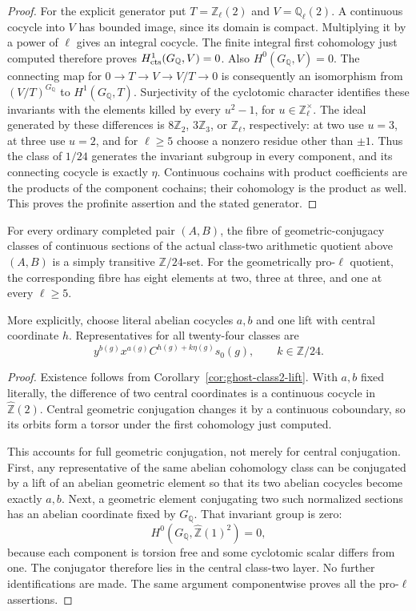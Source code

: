 \begin{proof}
For the explicit generator put \(T=\mathbb Z_\ell(2)\)
and \(V=\mathbb Q_\ell(2)\). A continuous cocycle into
\(V\) has bounded image, since its domain is compact.
Multiplying it by a power of \(\ell\) gives an integral
cocycle. The finite integral first cohomology just
computed therefore proves \(H^1_{\rm cts}(G_{\mathbb Q},V)=0\).
Also \(H^0(G_{\mathbb Q},V)=0\). The connecting map
for \(0\to T\to V\to V/T\to0\) is consequently an
isomorphism from \((V/T)^{G_{\mathbb Q}}\) to \(H^1(G_{\mathbb Q},T)\).
Surjectivity of the cyclotomic character identifies
these invariants with the elements killed by every
\(u^2-1\), for \(u\in\mathbb Z_\ell^\times\).
The ideal generated by these differences is
\(8\mathbb Z_2\), \(3\mathbb Z_3\), or \(\mathbb Z_\ell\),
respectively: at two use \(u=3\), at three use \(u=2\),
and for \(\ell\ge5\) choose a nonzero residue other
than \(\pm1\). Thus the class of \(1/24\) generates
the invariant subgroup in every component, and its
connecting cocycle is exactly \(\eta\).
Continuous cochains with product coefficients are the
products of the component cochains; their cohomology
is the product as well. This proves the profinite
assertion and the stated generator.
\end{proof}

\begin{corollary}
\label{cor:ghost-class2-fibre24}
For every ordinary completed pair \((A,B)\), the fibre
of geometric-conjugacy classes of continuous sections
of the actual class-two arithmetic quotient above
\((A,B)\) is a simply transitive \(\mathbb Z/24\)-set.
For the geometrically pro-\(\ell\) quotient, the
corresponding fibre has eight elements at two, three
at three, and one at every \(\ell\ge5\).

More explicitly, choose literal abelian cocycles \(a,b\)
and one lift with central coordinate \(h\). Representatives
for all twenty-four classes are
\[
       y^{b(g)}x^{a(g)}C^{h(g)+k\eta(g)}s_0(g),
                 \qquad k\in\mathbb Z/24.
\]
\end{corollary}
\begin{proof}
Existence follows from Corollary~\ref{cor:ghost-class2-lift}.
With \(a,b\) fixed literally, the difference of two
central coordinates is a continuous cocycle in
\(\widehat{\mathbb Z}(2)\). Central geometric conjugation
changes it by a continuous coboundary, so its orbits
form a torsor under the first cohomology just computed.

This accounts for full geometric conjugation, not merely
for central conjugation. First, any representative of
the same abelian cohomology class can be conjugated by
a lift of an abelian geometric element so that its two
abelian cocycles become exactly \(a,b\). Next, a
geometric element conjugating two such normalized
sections has an abelian coordinate fixed by
\(G_{\mathbb Q}\). That invariant group is zero:
\[
 H^0(G_{\mathbb Q},\widehat{\mathbb Z}(1)^2)=0,
\]
because each component is torsion free and some
cyclotomic scalar differs from one. The conjugator
therefore lies in the central class-two layer.
No further identifications are made. The same argument
componentwise proves all the pro-\(\ell\) assertions.
\end{proof}
